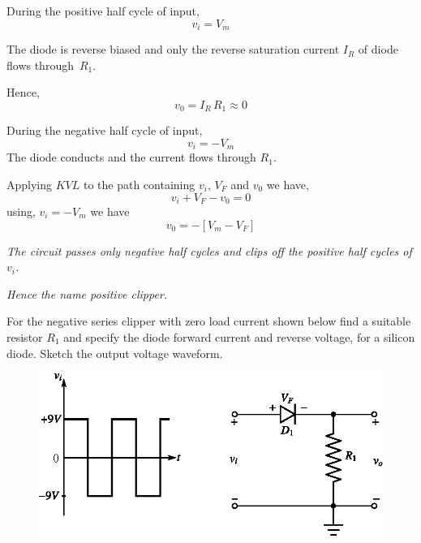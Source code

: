 During the positive half cycle of input,
$$
v_{i}=V_{m}
$$

The diode is reverse biased and only the reverse saturation current $I_{R}$ of diode flows through~$R_{1}$.

Hence,
\begin{equation}
v_{0}=I_{R}\,R_{1}\approx 0\label{eq2.92}
\end{equation}

During the negative half cycle of input,
$$
v_{i}=-V_{m}
$$
The diode conducts and the current flows through $R_{1}$.

Applying $KVL$ to the path containing $v_{i}$, $V_{F}$ and $v_{0}$ we have,
\begin{equation}
v_{i}+V_{F}-v_{0}=0\label{eq2.93}
\end{equation}
using, $v_{i}=-V_{m}$ we have
\begin{equation}
v_{0}=-[V_{m}-V_{F}]\label{eq2.94}
\end{equation}


{\em The circuit passes only negative half cycles and clips off the positive half cycles of $v_{i}$.}

{\em Hence the name positive clipper.}

\begin{example}\label{exam2.37}
For the negative series clipper with zero load current shown below find a suitable resistor $R_{1}$ and specify the diode forward current and reverse voltage, for a silicon diode. Sketch the output voltage waveform.
\begin{figure}[H]
\centering
\includegraphics{chap2/exp2.37.eps}
\end{figure}
\end{example}

